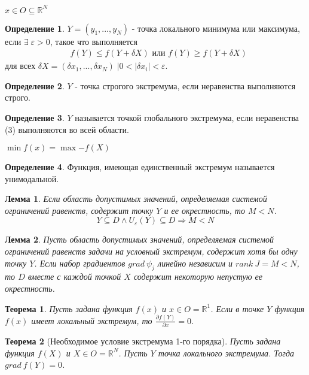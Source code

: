 \documentclass[12pt]{article}
\newtheorem{lemma}{Лемма}[section]
\newtheorem{theorem}{Теорема}[section]
\theoremstyle{definition}
\newtheorem{definition}{Определение}[section]
\theoremstyle{remark}
\begin{document}
$x\in O\subseteq \mathbb{R}^N$
\begin{definition}
  $Y=(y_1,...,y_N)$ - точка локального минимума или максимума, если $\exists \;\varepsilon >0$, такое что выполняется
   \begin{align}
     &f(Y) \leqslant f(Y+\delta X)\text{ или }f(Y) \geqslant f(Y+\delta X)
   \end{align}
   для всех $\delta X=(\delta x_1,...,\delta x_N)\;\big|0<|\delta x_i|<\varepsilon$.
\end{definition}
\begin{definition}
 $Y$ - точка строгого экстремума, если неравенства выполняются строго.
\end{definition}
\begin{definition}
 $Y$ называется точкой глобального экстремума, если неравенства (3) выполняются во всей области.
\end{definition}
$\min{f(x)}=\max{-f(X)}$
\begin{definition}
Функция, имеющая единственный экстремум называется унимодальной.
\end{definition}
\begin{lemma}
  Если область допустимых значений, определяемая системой ограничений равенств, содержит точку $Y$ и ее окрестность, то $M<N$.\\
  \begin{equation}
    Y\subseteq D\land U_{\varepsilon}(Y)\subseteq D\Rightarrow M<N
  \end{equation}
\end{lemma}
\begin{lemma}
  Пусть область допустимых значений, определяемая системой ограничений равенств задачи на условный экстремум, содержит хотя бы одну точку $Y$. Если набор градиентов $grad\: \psi_j$ линейно независим и $rank\: J=M<N$, то $D$ вместе с каждой точкой $X$ содержит некоторую непустую ее окрестность.
\end{lemma}
\begin{theorem}
Пусть задана функция $f(x)$ и $x\in O=\mathbb{R}^1$. Если в точке $Y$ функция $f(x)$ имеет локальный экстремум, то $\displaystyle \frac{\partial f(Y)}{\partial x}=0$.
\end{theorem}
\begin{theorem}[Необходимое условие экстремума 1-го порядка]
Пусть задана функция $f(X)$ и $X\in O=\mathbb{R}^N$. Пусть $Y$ точка локального экстремума. Тогда $grad\:f(Y)=0$.
\end{theorem}
\end{document}
